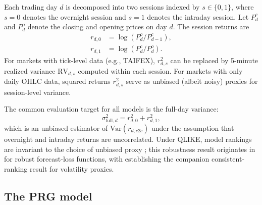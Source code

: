 \documentclass[11pt,a4paper]{article}
\begin{document}
Each trading day $d$ is decomposed into two sessions indexed by $s \in \{0, 1\}$, where $s = 0$ denotes the overnight session and $s = 1$ denotes the intraday session. Let $P^{c}_d$ and $P^{o}_d$ denote the closing and opening prices on day $d$. The session returns are
\begin{align}
    r_{d,0} &= \log(P^{o}_d / P^{c}_{d-1}), \label{eq:r_overnight} \\
    r_{d,1} &= \log(P^{c}_d / P^{o}_d). \label{eq:r_intraday}
\end{align}
For markets with tick-level data (e.g., TAIFEX), $r^2_{d,s}$ can be replaced by 5-minute realized variance $\text{RV}_{d,s}$ computed within each session. For markets with only daily OHLC data, squared returns $r^2_{d,s}$ serve as unbiased (albeit noisy) proxies for session-level variance.

The common evaluation target for all models is the full-day variance:
\begin{equation}
    \sigma^2_{\text{full},d} = r^2_{d,0} + r^2_{d,1},
    \label{eq:target}
\end{equation}
which is an unbiased estimator of $\text{Var}(r_{d,c2c})$ under the assumption that overnight and intraday returns are uncorrelated. Under QLIKE, model rankings are invariant to the choice of unbiased proxy \citep{Patton2011, Hansen2006}; this robustness result originates in \citet{Patton2011} for robust forecast-loss functions, with \citet{Hansen2006} establishing the companion consistent-ranking result for volatility proxies.

\subsection{The PRG model}
\end{document}
